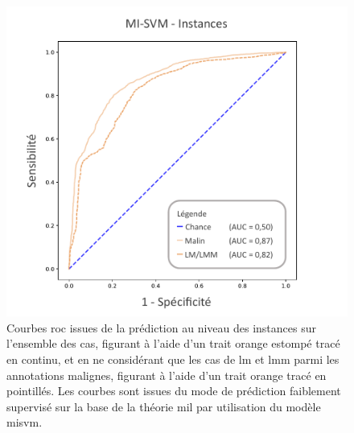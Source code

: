 \begin{figure}[H]
    \centering
    \includegraphics[width=0.8\linewidth]{contents/chapter_7/resources/results_lesion_roc_instances.pdf}
    \caption{Courbes \gls{roc} issues de la prédiction au niveau des instances sur l'ensemble des cas, figurant à l'aide d'un trait orange estompé tracé en continu, et en ne considérant que les cas de \gls{lm} et \gls{lmm} parmi les annotations malignes, figurant à l'aide d'un trait orange tracé en pointillés. Les courbes sont issues du mode de prédiction faiblement supervisé sur la base de la théorie \gls{mil} par utilisation du modèle \gls{misvm}.}
    \label{fig:results_lesion_roc_instances}
\end{figure}\par
\clearpage

